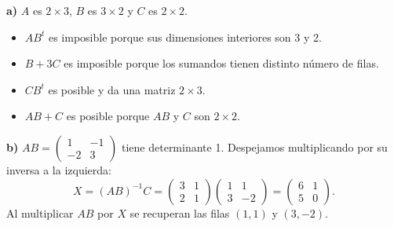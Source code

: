 \textbf{a)} $A$ es $2\times3$, $B$ es $3\times2$ y $C$ es $2\times2$.
\begin{itemize}
\item $AB^t$ es imposible porque sus dimensiones interiores son 3 y 2.
\item $B+3C$ es imposible porque los sumandos tienen distinto número de filas.
\item $CB^t$ es posible y da una matriz $2\times3$.
\item $AB+C$ es posible porque $AB$ y $C$ son $2\times2$.
\end{itemize}
\textbf{b)} $AB=\begin{pmatrix}1&-1\\-2&3\end{pmatrix}$ tiene
determinante 1. Despejamos multiplicando por su inversa a la izquierda:
\[
X=(AB)^{-1}C=
\begin{pmatrix}3&1\\2&1\end{pmatrix}\begin{pmatrix}1&1\\3&-2\end{pmatrix}
=\boxed{\begin{pmatrix}6&1\\5&0\end{pmatrix}}.
\]
Al multiplicar $AB$ por $X$ se recuperan las filas $(1,1)$ y $(3,-2)$.

